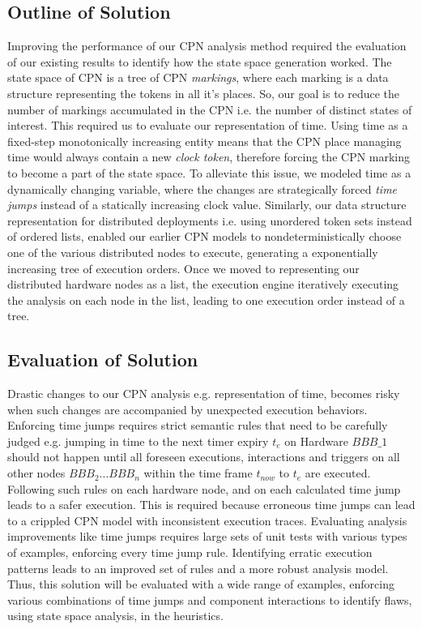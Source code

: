 \subsection{Outline of Solution}
Improving the performance of our CPN analysis method required the evaluation of our existing results to identify how the state space generation worked. The state space of CPN is a tree of CPN \emph{markings}, where each marking is a data structure representing the tokens in all it's places. So, our goal is to reduce the number of markings accumulated in the CPN i.e. the number of distinct states of interest. This required us to evaluate our representation of time. Using time as a fixed-step monotonically increasing entity means that the CPN place managing time would always contain a new \emph{clock token}, therefore forcing the CPN marking to become a part of the state space.
To alleviate this issue, we modeled time as a dynamically changing variable, where the changes are strategically forced \emph{time jumps} instead of a statically increasing clock value. Similarly, our data structure representation for distributed deployments i.e. using unordered token sets instead of ordered lists, enabled our earlier CPN models to nondeterministically choose one of the various distributed nodes to execute, generating a exponentially increasing tree of execution orders. Once we moved to representing our distributed hardware nodes as a list, the execution engine iteratively executing the analysis on each node in the list, leading to one execution order instead of a tree. 

\subsection{Evaluation of Solution}
Drastic changes to our CPN analysis e.g. representation of time, becomes risky when such changes are accompanied by unexpected execution behaviors. Enforcing time jumps requires strict semantic rules that need to be carefully judged e.g. jumping in time to the next timer expiry $t_{e}$ on Hardware $BBB\_1$ should not happen until all foreseen executions, interactions and triggers on all other nodes $BBB_2 ... BBB_n$ within the time frame $t_{now}$ to $t_e$ are executed. Following such rules on each hardware node, and on each calculated time jump leads to a safer execution. This is required because erroneous time jumps can lead to a crippled CPN model with inconsistent execution traces. Evaluating analysis improvements like time jumps requires large sets of unit tests with various types of examples, enforcing every time jump rule. Identifying erratic execution patterns leads to an improved set of rules and a more robust analysis model. Thus, this solution will be evaluated with a wide range of examples, enforcing various combinations of time jumps and component interactions to identify flaws, using state space analysis, in the heuristics. 

